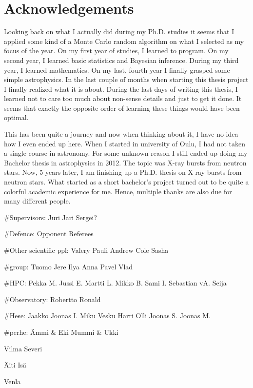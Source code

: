 \chapter*{Acknowledgements}

Looking back on what I actually did during my Ph.D. studies it seems that I applied some kind of a Monte Carlo random algorithm on what I selected as my focus of the year.
On my first year of studies, I learned to program.
On my second year, I learned basic statistics and Bayesian inference.
During my third year, I learned mathematics.
On my last, fourth year I finally grasped some simple astrophysics.
In the last couple of months when starting this thesis project I finally realized what it is about.
During the last days of writing this thesis, I learned not to care too much about non-sense details and just to get it done.
It seems that exactly the opposite order of learning these things would have been optimal.

This has been quite a journey and now when thinking about it, I have no idea how I even ended up here.
When I started in university of Oulu, I had not taken a single course in astronomy.
For some unknown reason I still ended up doing my Bachelor thesis in astrophysics in 2012.
The topic was X-ray bursts from neutron stars.
Now, 5 years later, I am finishing up a Ph.D. thesis on X-ray bursts from neutron stars.
What started as a short bachelor's project turned out to be quite a colorful academic experience for me.
Hence, multiple thanks are also due for many different people.



#Supervisors:
Juri
Jari
Sergei?

#Defence:
Opponent
Referees

#Other scientific ppl:
Valery
Pauli
Andrew
Cole
Sasha

#group:
Tuomo
Jere
Ilya
Anna
Pavel
Vlad

#HPC:
Pekka M.
Jussi E.
Martti L.
Mikko B.
Sami I.
Sebastian vA.
Seija 

#Observatory:
Robertto
Ronald

#Hese:
Jaakko
Joonas I.
Miku
Vesku
Harri
Olli
Joonas S.
Joonas M.

#perhe:
Ämmi & Eki
Mummi & Ukki

Vilma
Severi

Äiti
Isä

Venla


